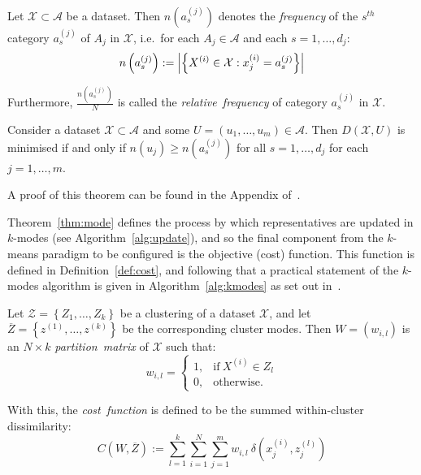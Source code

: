 \begin{definition}\label{def:rel-freq}
    Let \(\mathcal{X} \subset \mathcal{A}\) be a dataset. Then
    \(n\left(a_s^{(j)}\right)\) denotes the \emph{frequency} of the \(s^{th}\)
    category \(a_s^{(j)}\) of \(A_j\) in \(\mathcal{X}\), i.e.\ for each \(A_j
    \in \mathcal{A}\) and each \(s = 1, \ldots, d_j\):
    \begin{equation}
        n\left(a_s^{(j)}\right) := \abs*{%
            {\left\{X^{(i)} \in \mathcal{X}: x_j^{(i)} = a_s^{(j)}\right\}}
        }
    \end{equation}
	
    Furthermore, \(\frac{n\left(a_s^{(j)}\right)}{N}\) is called the
    \emph{relative~frequency} of category \(a_s^{(j)}\) in \(\mathcal{X}\).
\end{definition}

\begin{theorem}\label{thm:mode}
    Consider a dataset \(\mathcal{X} \subset \mathcal{A}\) and some \(U = (u_1,
    \ldots, u_m) \in \mathcal{A}\). Then \(D(\mathcal{X}, U)\) is minimised if
    and only if \(n\left(u_j\right) \geq n\left(a_s^{(j)}\right)\) for all
    \(s=1, \ldots, d_j\) for each \(j = 1, \ldots, m\).

    A proof of this theorem can be found in the Appendix of~\cite{Huang1998}.
\end{theorem}

%

Theorem~\ref{thm:mode} defines the process by which representatives are updated
in \(k\)-modes (see Algorithm~\ref{alg:update}), and so the final component from
the \(k\)-means paradigm to be configured is the objective (cost) function. This
function is defined in Definition~\ref{def:cost}, and following that a practical
statement of the \(k\)-modes algorithm is given in Algorithm~\ref{alg:kmodes} as
set out in~\cite{Huang1998}.

\begin{definition}\label{def:cost}
    Let \(\mathcal{Z} = \left\{Z_1, \ldots, Z_k\right\}\) be a clustering of a
    dataset \(\mathcal{X}\), and let \(\overline Z = \left\{z^{(1)},
    \ldots, z^{(k)}\right\}\) be the corresponding cluster modes. Then \(W =
    \left(w_{i, l}\right)\) is an \(N \times k\) \emph{partition~matrix} of
    \(\mathcal{X}\) such that:
    \[
        w_{i, l} = \begin{cases}
                     1, & \text{if} \ X^{(i)} \in Z_l\\
                     0, & \text{otherwise.}
                   \end{cases}
    \]

    With this, the \emph{cost~function} is defined to be the summed
    within-cluster dissimilarity:
    \begin{equation}
        C\left(W, \overline Z\right) := \sum_{l=1}^{k} \sum_{i=1}^{N}
        \sum_{j=1}^{m} w_{i,l} \ \delta\left(x_j^{(i)}, z_j^{(l)}\right)
    \end{equation}
\end{definition}

